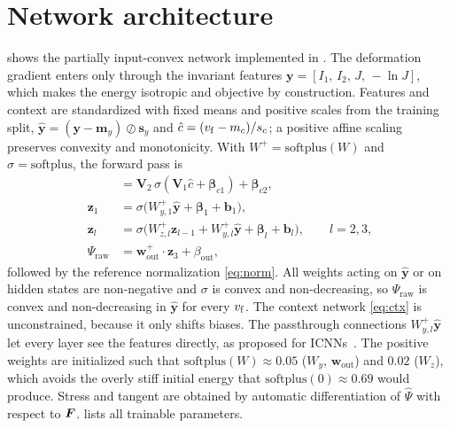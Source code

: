 \section{Network architecture}\label{sec:architecture}

 shows the partially input-convex network implemented in
. The deformation gradient enters only through the invariant
features $\bm y=[I_1,\,I_2,\,J,\,-\ln J]$, which makes the energy isotropic and
objective by construction. Features and context are standardized with fixed means
and positive scales from the training split, $\hat{\bm y}=(\bm y-\bm m_y)\oslash\bm s_y$
and $\hat c=(v_{\mathrm f}-m_c)/s_c$; a positive affine scaling preserves convexity and
monotonicity. With $W^{+}=\mathrm{softplus}(W)$ and $\sigma=\mathrm{softplus}$, the
forward pass is
\begin{align}
  [\bm b_1,\bm b_2,\bm b_3] &= \bm V_2\,\sigma(\bm V_1\hat c+\bm\beta_{c1})+\bm\beta_{c2},\label{eq:ctx}\\
  \bm z_1 &= \sigma\bigl(W_{y,1}^{+}\hat{\bm y}+\bm\beta_1+\bm b_1\bigr),\\
  \bm z_l &= \sigma\bigl(W_{z,l}^{+}\bm z_{l-1}+W_{y,l}^{+}\hat{\bm y}+\bm\beta_l+\bm b_l\bigr),\qquad l=2,3,\\
  \Psi_{\mathrm{raw}} &= \bm w_{\mathrm{out}}^{+}\cdot\bm z_3+\beta_{\mathrm{out}},
\end{align}
followed by the reference normalization \cref{eq:norm}. All weights acting on
$\hat{\bm y}$ or on hidden states are non-negative and $\sigma$ is convex and
non-decreasing, so $\Psi_{\mathrm{raw}}$ is convex and non-decreasing in $\hat{\bm y}$
for every $v_{\mathrm f}$. The context network \cref{eq:ctx} is unconstrained, because it only
shifts biases. The passthrough connections $W_{y,l}^{+}\hat{\bm y}$ let every layer see
the features directly, as proposed for ICNNs~\cite{Amos2017}. The positive weights
are initialized such that $\mathrm{softplus}(W)\approx0.05$ ($W_y$, $\bm w_{\mathrm{out}}$)
and $0.02$ ($W_z$), which avoids the overly stiff initial energy that
$\mathrm{softplus}(0)\approx0.69$ would produce. Stress and tangent are obtained by
automatic differentiation of $\widehat\Psi$ with respect to $\bm F$. 
lists all trainable parameters.

